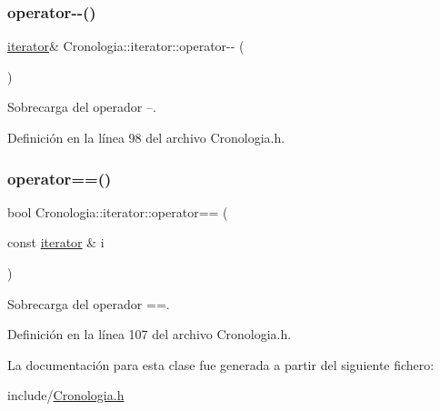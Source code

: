 \hypertarget{classCronologia_1_1iterator_af80e6a7382b8c7324df4394a7fe82eda}{}\label{classCronologia_1_1iterator_af80e6a7382b8c7324df4394a7fe82eda} 
\subsubsection{\texorpdfstring{operator-\/-\/()}{operator--()}}
{\footnotesize\ttfamily \hyperlink{classCronologia_1_1iterator}{iterator}\& Cronologia\+::iterator\+::operator-\/-\/ (\begin{DoxyParamCaption}{ }\end{DoxyParamCaption})\hspace{0.3cm}{\ttfamily [inline]}}



Sobrecarga del operador --. 



Definición en la línea 98 del archivo Cronologia.\+h.

\hypertarget{classCronologia_1_1iterator_a126b17bf29145d4bb39c7eb184225ad4}{}\label{classCronologia_1_1iterator_a126b17bf29145d4bb39c7eb184225ad4} 
\subsubsection{\texorpdfstring{operator==()}{operator==()}}
{\footnotesize\ttfamily bool Cronologia\+::iterator\+::operator== (\begin{DoxyParamCaption}\item[{const \hyperlink{classCronologia_1_1iterator}{iterator} \&}]{i }\end{DoxyParamCaption})\hspace{0.3cm}{\ttfamily [inline]}}



Sobrecarga del operador ==. 



Definición en la línea 107 del archivo Cronologia.\+h.



La documentación para esta clase fue generada a partir del siguiente fichero\+:\begin{DoxyCompactItemize}
\item 
include/\hyperlink{Cronologia_8h}{Cronologia.\+h}\end{DoxyCompactItemize}
